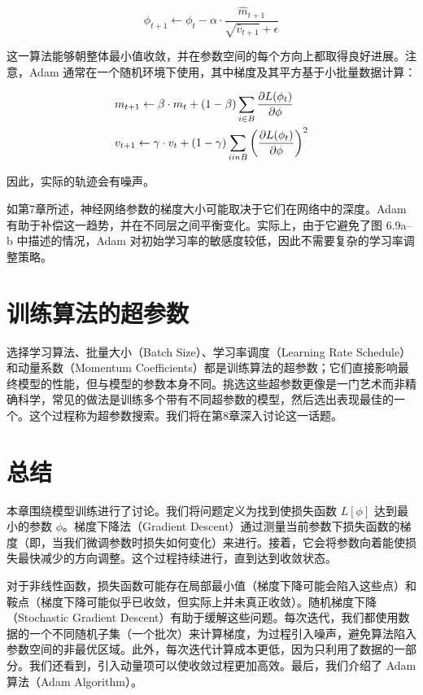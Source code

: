 \begin{equation}
\phi_{t+1} \leftarrow \phi_t - \alpha \cdot \frac{\hat{m}_{t+1}}{\sqrt{\hat{v}_{t+1}} + \epsilon} 
\end{equation}

这一算法能够朝整体最小值收敛，并在参数空间的每个方向上都取得良好进展。注意，Adam 通常在一个随机环境下使用，其中梯度及其平方基于小批量数据计算：

\begin{align}
&m_{t+1} \leftarrow \beta \cdot m_t + (1 - \beta) \sum_{i \in B} \frac{\partial L(\phi_t)}{\partial \phi} \notag \\
&v_{t+1} \leftarrow \gamma \cdot v_t + (1 - \gamma) \sum_{i in B} \left( \frac{\partial L(\phi_t)}{\partial \phi} \right)^2 
\end{align}

因此，实际的轨迹会有噪声。

如第7章所述，神经网络参数的梯度大小可能取决于它们在网络中的深度。Adam 有助于补偿这一趋势，并在不同层之间平衡变化。实际上，由于它避免了图 6.9a–b 中描述的情况，Adam 对初始学习率的敏感度较低，因此不需要复杂的学习率调整策略。

\section{训练算法的超参数}
选择学习算法、批量大小（Batch Size）、学习率调度（Learning Rate Schedule）和动量系数（Momentum Coefficients）都是训练算法的超参数；它们直接影响最终模型的性能，但与模型的参数本身不同。挑选这些超参数更像是一门艺术而非精确科学，常见的做法是训练多个带有不同超参数的模型，然后选出表现最佳的一个。这个过程称为超参数搜索。我们将在第8章深入讨论这一话题。

\section{总结}
本章围绕模型训练进行了讨论。我们将问题定义为找到使损失函数 \(L[\phi]\) 达到最小的参数 \(\phi\)。梯度下降法（Gradient Descent）通过测量当前参数下损失函数的梯度（即，当我们微调参数时损失如何变化）来进行。接着，它会将参数向着能使损失最快减少的方向调整。这个过程持续进行，直到达到收敛状态。

对于非线性函数，损失函数可能存在局部最小值（梯度下降可能会陷入这些点）和鞍点（梯度下降可能似乎已收敛，但实际上并未真正收敛）。随机梯度下降（Stochastic Gradient Descent）有助于缓解这些问题。每次迭代，我们都使用数据的一个不同随机子集（一个批次）来计算梯度，为过程引入噪声，避免算法陷入参数空间的非最优区域。此外，每次迭代计算成本更低，因为只利用了数据的一部分。我们还看到，引入动量项可以使收敛过程更加高效。最后，我们介绍了 Adam 算法（Adam Algorithm）。


